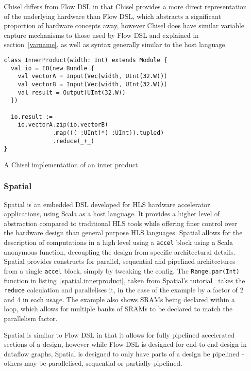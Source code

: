 Chisel differs from Flow DSL in that Chisel provides a more direct representation of the underlying hardware than Flow DSL, which abstracts a significant proportion of hardware concepts away, however Chisel does have similar variable capture mechanisms to those used by Flow DSL and explained in section \ref{varname}, as well as syntax generally similar to the host language.

\renewcommand\theFancyVerbLine{\arabic{FancyVerbLine}}
\begin{listing}[H]
  \begin{verbatim}
class InnerProduct(width: Int) extends Module {
  val io = IO(new Bundle {
    val vectorA = Input(Vec(width, UInt(32.W)))
    val vectorB = Input(Vec(width, UInt(32.W)))
    val result = Output(UInt(32.W))
  })
  
  io.result :=
    io.vectorA.zip(io.vectorB)
              .map(((_:UInt)*(_:UInt)).tupled)
              .reduce(_+_)
}
\end{verbatim}
  \caption{A Chisel implementation of an inner product}\label{chisel.innerproduct}
\end{listing}

\subsubsection{Spatial}
Spatial is an embedded DSL developed for HLS hardware accelerator applications, using Scala as a host language. It provides a higher level of abstraction compared to traditional HLS tools while offering finer control over the hardware design than general purpose HLS languages. Spatial allows for the description of computations in a high level using a \lstinline|accel| block using a Scala anonymous function, decoupling the design from specific architectural details. Spatial provides constructs for parallel, sequential and pipelined architectures from a single \lstinline|accel| block, simply by tweaking the config. The \lstinline|Range.par(Int)| function in listing \ref{spatial.innerproduct}, taken from Spatial's tutorial \cite{spatialtut} takes the \lstinline|reduce| calculation and parallelises it, in the case of the example by a factor of 2 and 4 in each usage. The example also shows SRAMs being declared within a loop, which allows for multiple banks of SRAMs to be declared to match the parallelism factor.

Spatial is similar to Flow DSL in that it allows for fully pipelined accelerated sections of a design, however while Flow DSL is designed for end-to-end design in dataflow graphs, Spatial is designed to only have parts of a design be pipelined \hyphen{} others may be parallelised, sequential or partially pipelined.

